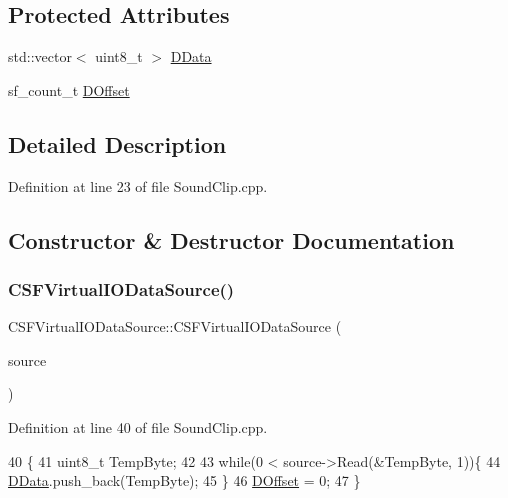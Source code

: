 \subsection*{Protected Attributes}
\begin{DoxyCompactItemize}
\item 
std\+::vector$<$ uint8\+\_\+t $>$ \hyperlink{classCSFVirtualIODataSource_ac03be5c46b6647150e12edc04fa52ede}{D\+Data}
\item 
sf\+\_\+count\+\_\+t \hyperlink{classCSFVirtualIODataSource_a29db7bf8a3a7103deacb80bf619919c8}{D\+Offset}
\end{DoxyCompactItemize}


\subsection{Detailed Description}


Definition at line 23 of file Sound\+Clip.\+cpp.



\subsection{Constructor \& Destructor Documentation}
\hypertarget{classCSFVirtualIODataSource_acd8bf4483224c3101dafc14df967bc24}{}\label{classCSFVirtualIODataSource_acd8bf4483224c3101dafc14df967bc24} 
\subsubsection{\texorpdfstring{C\+S\+F\+Virtual\+I\+O\+Data\+Source()}{CSFVirtualIODataSource()}}
{\footnotesize\ttfamily C\+S\+F\+Virtual\+I\+O\+Data\+Source\+::\+C\+S\+F\+Virtual\+I\+O\+Data\+Source (\begin{DoxyParamCaption}\item[{std\+::shared\+\_\+ptr$<$ \hyperlink{classCDataSource}{C\+Data\+Source} $>$}]{source }\end{DoxyParamCaption})}



Definition at line 40 of file Sound\+Clip.\+cpp.


\begin{DoxyCode}
40                                                                                  \{
41     uint8\_t TempByte;
42     
43     \textcolor{keywordflow}{while}(0 < source->Read(&TempByte, 1))\{
44         \hyperlink{classCSFVirtualIODataSource_ac03be5c46b6647150e12edc04fa52ede}{DData}.push\_back(TempByte);   
45     \}
46     \hyperlink{classCSFVirtualIODataSource_a29db7bf8a3a7103deacb80bf619919c8}{DOffset} = 0;
47 \}
\end{DoxyCode}


